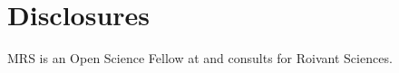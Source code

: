 \documentclass[9pt]{elife}
\begin{document}
\section{Disclosures}
MRS is an Open Science Fellow at and consults for Roivant Sciences.




\clearpage

\clearpage
\end{document}
